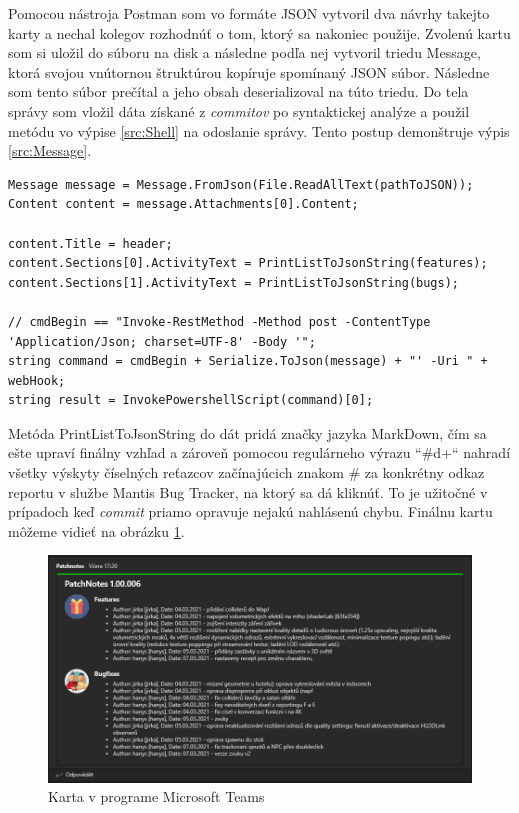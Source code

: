 \documentclass[slovak, bachelorpractice]{diploma}
\begin{document}
Pomocou nástroja Postman som vo formáte JSON vytvoril dva návrhy takejto karty a nechal kolegov rozhodnúť o tom, ktorý sa nakoniec použije. Zvolenú kartu som si uložil do súboru na disk a následne podľa nej vytvoril triedu Message, ktorá svojou vnútornou štruktúrou kopíruje spomínaný JSON súbor. Následne som tento súbor prečítal a jeho obsah deserializoval na túto triedu. Do tela správy som vložil dáta získané z \textit{commitov} po syntaktickej analýze a použil metódu vo výpise \ref{src:Shell} na odoslanie správy. Tento postup demonštruje výpis \ref{src:Message}. 
\vspace{10pt}
\begin{lstlisting}[label=src:Message,caption={Vytvorenie a odoslanie správy do služby Microsoft Teams}]
Message message = Message.FromJson(File.ReadAllText(pathToJSON));
Content content = message.Attachments[0].Content;

content.Title = header;
content.Sections[0].ActivityText = PrintListToJsonString(features);
content.Sections[1].ActivityText = PrintListToJsonString(bugs);

// cmdBegin == "Invoke-RestMethod -Method post -ContentType 'Application/Json; charset=UTF-8' -Body '";
string command = cmdBegin + Serialize.ToJson(message) + "' -Uri " + webHook;
string result = InvokePowershellScript(command)[0];
\end{lstlisting}

Metóda PrintListToJsonString do dát pridá značky jazyka MarkDown, čím sa ešte upraví finálny vzhľad a zároveň pomocou regulárneho výrazu \mbox{``\#\\d+``} nahradí všetky výskyty číselných reťazcov začínajúcich znakom \# za konkrétny odkaz reportu v službe Mantis Bug Tracker, na ktorý sa dá kliknúť. To je užitočné v prípadoch keď \textit{commit} priamo opravuje nejakú nahlásenú chybu. Finálnu kartu môžeme vidieť na obrázku \ref{pic:Logger}.

\begin{figure}[!htbp]
	\centering
	\includegraphics[width=1\textwidth]{Pictures/gitlogger.png}
	\caption{Karta v programe Microsoft Teams}
	\label{pic:Logger}
\end{figure}
\end{document}
